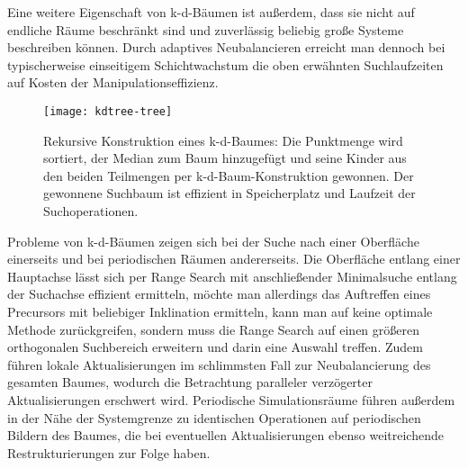 Eine weitere Eigenschaft von k-d-Bäumen ist außerdem, dass sie nicht auf endliche Räume beschränkt sind und zuverlässig beliebig große Systeme beschreiben können.
Durch adaptives Neubalancieren erreicht man dennoch bei typischerweise einseitigem Schichtwachstum die oben erwähnten Suchlaufzeiten auf Kosten der Manipulationseffizienz.

\begin{figure}[bthp]
  \texttt{[image: kdtree-tree]}
  \caption[Konstruktion eines k-d-Baumes]{
    Rekursive Konstruktion eines k-d-Baumes: Die Punktmenge wird sortiert, der Median zum Baum hinzugefügt und seine Kinder aus den beiden Teilmengen per k-d-Baum-Konstruktion gewonnen.
    Der gewonnene Suchbaum ist effizient in Speicherplatz und Laufzeit der Suchoperationen.
  }
  \label{fig:kdtree}
\end{figure}


Probleme von k-d-Bäumen zeigen sich bei der Suche nach einer Oberfläche einerseits und bei periodischen Räumen andererseits.
Die Oberfläche entlang einer Hauptachse lässt sich per Range Search mit anschließender Minimalsuche entlang der Suchachse effizient ermitteln, möchte man allerdings das Auftreffen eines Precursors mit beliebiger Inklination ermitteln, kann man auf keine optimale Methode zurückgreifen, sondern muss die Range Search auf einen größeren orthogonalen Suchbereich erweitern und darin eine Auswahl treffen.
Zudem führen lokale Aktualisierungen im schlimmsten Fall zur Neubalancierung des gesamten Baumes, wodurch die Betrachtung paralleler verzögerter Aktualisierungen erschwert wird.
Periodische Simulationsräume führen außerdem in der Nähe der Systemgrenze zu identischen Operationen auf periodischen Bildern des Baumes, die bei eventuellen Aktualisierungen ebenso weitreichende Restrukturierungen zur Folge haben.

